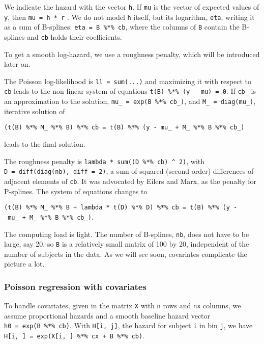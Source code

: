 \documentclass[
  letterpaper,
  DIV=11,
  numbers=noendperiod]{scrartcl}
\begin{document}
We indicate the hazard with the vector \texttt{h}. If \texttt{mu} is the
vector of expected values of \texttt{y}, then \texttt{mu\ =\ h\ *\ r} .
We do not model \texttt{h} itself, but its logarithm, \texttt{eta},
writing it as a sum of B-splines: \texttt{eta\ =\ B\ \%*\%\ cb}, where
the columns of \texttt{B} contain the B-splines and \texttt{cb} holds
their coefficients.

To get a smooth log-hazard, we use a roughness penalty, which will be
introduced later on.

The Poisson log-likelihood is \texttt{ll\ =\ sum(...)} and maximizing it
with respect to \texttt{cb} leads to the non-linear system of equations
\texttt{t(B)\ \%*\%\ (y\ -\ mu)\ =\ 0}. If \texttt{cb\_} is an
approximation to the solution, \texttt{mu\_\ =\ exp(B\ \%*\%\ cb\_)},
and \texttt{M\_\ =\ diag(mu\_)}, iterative solution of

\texttt{(t(B)\ \%*\%\ M\_\ \%*\%\ B)\ \%*\%\ cb\ =\ t(B)\ \%*\%\ (y\ -\ mu\_\ +\ M\_\ \%*\%\ B\ \%*\%\ cb\_)}

leads to the final solution.

The roughness penalty is
\texttt{lambda\ *\ sum((D\ \%*\%\ cb)\ \^{}\ 2)}, with
\texttt{D\ =\ diff(diag(nb),\ diff\ =\ 2)}, a sum of squared (second
order) differences of adjacent elements of \texttt{cb}. It was advocated
by Eilers and Marx, as the penalty for P-splines. The system of
equations changes to

\texttt{(t(B)\ \%*\%\ M\_\ \%*\%\ B\ +\ lambda\ *\ t(D)\ \%*\%\ D)\ \%*\%\ cb\ =\ t(B)\ \%*\%\ (y\ -\ mu\_\ +\ M\_\ \%*\%\ B\ \%*\%\ cb\_)}.

The computing load is light. The number of B-splines, \texttt{nb}, does
not have to be large, say 20, so \texttt{B} is a relatively small matrix
of 100 by 20, independent of the number of subjects in the data. As we
will see soon, covariates complicate the picture a lot.

\hypertarget{poisson-regression-with-covariates}{%
\subsubsection{Poisson regression with
covariates}\label{poisson-regression-with-covariates}}

To handle covariates, given in the matrix \texttt{X} with \texttt{n}
rows and \texttt{nx} columns, we assume proportional hazards and a
smooth baseline hazard vector \texttt{h0\ =\ exp(B\ \%*\%\ cb)}. With
\texttt{H{[}i,\ j{]}}, the hazard for subject \texttt{i} in bin
\texttt{j}, we have
\texttt{H{[}i,\ {]}\ =\ exp(X{[}i,\ {]}\ \%*\%\ cx\ +\ B\ \%*\%\ cb)}.
\end{document}
